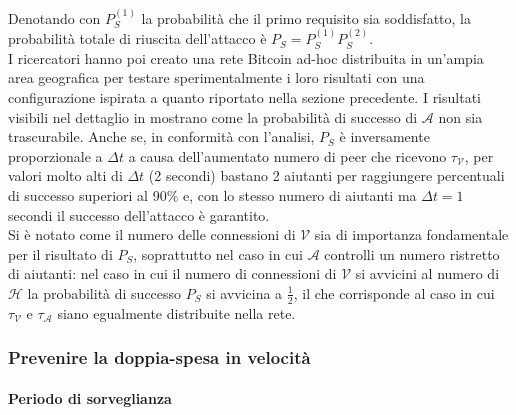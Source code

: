 Denotando con $P^{\left(1\right)}_S$ la probabilità che il primo requisito sia soddisfatto, la probabilità totale di riuscita dell'attacco è $P_S = P^{\left(1\right)}_S P^{\left(2\right)}_S$.\\
I ricercatori hanno poi creato una rete Bitcoin ad-hoc distribuita in un'ampia area geografica per testare sperimentalmente i loro risultati con una configurazione ispirata a quanto riportato nella sezione precedente. I risultati visibili nel dettaglio in \cite{doublespendig_fast} mostrano come la probabilità di successo di $\mathcal{A}$ non sia trascurabile. Anche se, in conformità con l'analisi, $P_S$ è inversamente proporzionale a $\Delta t$ a causa dell'aumentato numero di peer che ricevono $\tau_\mathcal{V}$, per valori molto alti di $\Delta t$ (2 secondi) bastano 2 aiutanti per raggiungere percentuali di successo superiori al 90\% e, con lo stesso numero di aiutanti ma $\Delta t = 1$ secondi il successo dell'attacco è garantito.\\
Si è notato come il numero delle connessioni di $\mathcal{V}$ sia di importanza fondamentale per il risultato di $P_S$, soprattutto nel caso in cui $\mathcal{A}$ controlli un numero ristretto di aiutanti: nel caso in cui il numero di connessioni di $\mathcal{V}$ si avvicini al numero di $\mathcal{H}$ la probabilità di successo $P_S$ si avvicina a $\frac{1}{2}$, il che corrisponde al caso in cui $\tau_\mathcal{V}$ e $\tau_\mathcal{A}$ siano egualmente distribuite nella rete.

\subsubsection{Prevenire la doppia-spesa in velocità}\label{prevenzione-doppia-spesa}

\paragraph{Periodo di sorveglianza}

